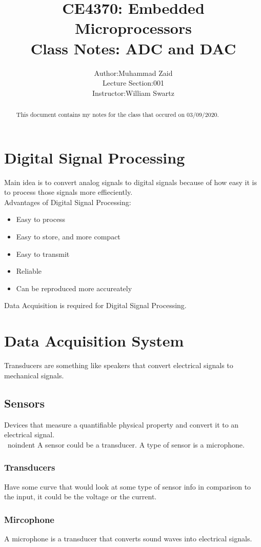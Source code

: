 \documentclass{article}
\title{%
  CE4370: Embedded Microprocessors \\
  \large {Class Notes: ADC and DAC}\\
  }
\author{\begin{tabular}{r@{ }l} 
Author:      & Muhammad Zaid \\[1ex] 
Lecture Section:    & 001 \\
Instructor: &William Swartz
\end{tabular}}
\begin{document}
\maketitle
\vfill{}
\begin{abstract}
\noindent This document contains my notes for the class that occured on 03/09/2020.\\
\end{abstract}

\newpage

\section{Digital Signal Processing}
Main idea is to convert analog signals to digital signals because of how easy it is to process those signals more effieciently.\\

Advantages of Digital Signal Processing:
\begin{itemize}
    \item Easy to process
    \item Easy to store, and more compact
    \item Easy to transmit
    \item Reliable
    \item Can be reproduced more accureately
\end{itemize}

Data Acquisition is required for Digital Signal Processing.\\

\section{Data Acquisition System}
Transducers are something like speakers that convert electrical signals to mechanical signals.\\

\subsection{Sensors}
Devices that measure a quantifiable physical property and convert it to an electrical signal.\\

\
noindent A sensor could be a transducer.
A type of sensor is a microphone.\\

\subsubsection{Transducers}
Have some curve that would look at some type of sensor info in comparison to the input, it could be the voltage or the current.\\   

\subsubsection{Mircophone}
A microphone is a transducer that converts sound waves into electrical signals.\\
\end{document}
